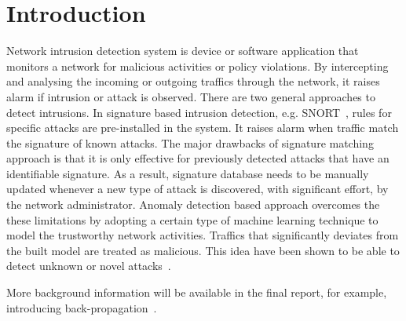 \section{Introduction}

Network intrusion detection system is device or software application that monitors a network
for malicious activities or policy violations.
By intercepting and analysing the incoming or outgoing traffics through the network,
it raises alarm if intrusion or attack is observed.
There are two general approaches to detect intrusions.
In signature based intrusion detection, e.g. SNORT~\cite{Snort}, rules for specific attacks
are pre-installed in the system.
It raises alarm when traffic match the signature of known attacks.
The major drawbacks of signature matching approach is that
it is only effective for previously detected attacks that have an identifiable signature.
As a result, signature database needs to be manually updated whenever a new type of attack
is discovered, with significant effort, by the network administrator.
Anomaly detection based approach overcomes the these limitations by adopting a certain
type of machine learning technique to model the trustworthy network activities.
Traffics that significantly deviates from the built model are treated as malicious.
This idea have been shown to be able to detect unknown or novel attacks~\cite{NSL-KDD, STL-NIDS}.




More background information will be available in the final report,
for example, introducing back-propagation~\cite{Backpropagation}.
